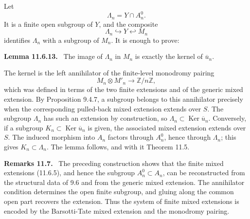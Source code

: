 \documentclass[11pt]{article}
\newcommand{\Ker}{\operatorname{Ker}}
\newcommand{\Z}{\mathbb Z}
\newenvironment{statement}[1]{\par\medskip\noindent\textbf{#1.}\ }{\par\medskip}
\newenvironment{remarktext}[1]{\par\medskip\noindent\textbf{#1.}\ }{\par\medskip}
\begin{document}
Let
\begin{equation}\tag{11.6.9}
        \Lambda_n=Y\cap A_n^0.
\end{equation}
It is a finite open subgroup of \(Y\), and the composite
\begin{equation}\tag{11.6.11}
        \Lambda_n\hookrightarrow Y\hookleftarrow M_n
\end{equation}
identifies \(\Lambda_n\) with a subgroup of \(M_n\).  It is enough to prove:

\begin{statement}{Lemma 11.6.13}
The image of \(\Lambda_n\) in \(M_n\) is exactly the kernel of \(\overline u_n\).
\end{statement}
The kernel is the left annihilator of the finite-level monodromy pairing
\[
        M_n\otimes M'_n\longrightarrow \Z/n\Z,
\]
which was defined in terms of the two finite extensions and of the generic mixed extension.  By Proposition 9.4.7, a subgroup belongs to this annihilator precisely when the corresponding pulled-back mixed extension extends over \(S\).  The subgroup \(\Lambda_n\) has such an extension by construction, so \(\Lambda_n\subset\Ker\overline u_n\).  Conversely, if a subgroup \(K_n\subset\Ker\overline u_n\) is given, the associated mixed extension extends over \(S\).  The induced morphism into \(A_n\) factors through \(A_n^0\), hence through \(\Lambda_n\); this gives \(K_n\subset\Lambda_n\).  The lemma follows, and with it Theorem 11.5.

\begin{remarktext}{Remarks 11.7}
The preceding construction shows that the finite mixed extensions (11.6.5), and hence the subgroup \(A_n^0\subset A_n\), can be reconstructed from the structural data of 9.6 and from the generic mixed extension.  The annihilator condition determines the open finite subgroup, and gluing along the common open part recovers the extension.  Thus the system of finite mixed extensions is encoded by the Barsotti-Tate mixed extension and the monodromy pairing.
\end{remarktext}
\end{document}
